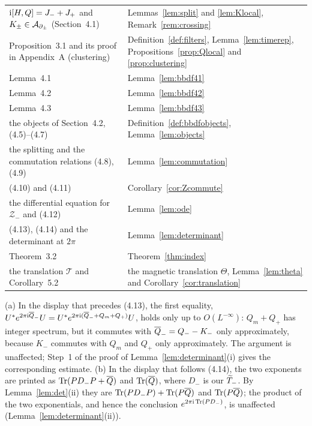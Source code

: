 \begin{longtable}{@{}p{}p{}@{}}
$\mathrm{i}[H,Q]=J_-+J_+$ and $K_\pm\in\mathcal{A}_{\partial_\pm}$ (Section~4.1) & Lemmas~\ref{lem:split} and \ref{lem:Klocal},
Remark~\ref{rem:crossing}\\
Proposition~3.1 and its proof in Appendix~A (clustering) & Definition~\ref{def:filters}, Lemma~\ref{lem:timerep},
Propositions~\ref{prop:Qlocal} and \ref{prop:clustering}\\
Lemma~4.1 & Lemma~\ref{lem:bbdf41}\\
Lemma~4.2 & Lemma~\ref{lem:bbdf42}\\
Lemma~4.3 & Lemma~\ref{lem:bbdf43}\\
the objects of Section~4.2, (4.5)--(4.7) & Definition~\ref{def:bbdfobjects}, Lemma~\ref{lem:objects}\\
the splitting and the commutation relations (4.8), (4.9) & Lemma~\ref{lem:commutation}\\
(4.10) and (4.11) & Corollary~\ref{cor:Zcommute}\\
the differential equation for $\mathcal Z_-$ and (4.12) & Lemma~\ref{lem:ode}\\
(4.13), (4.14) and the determinant at $2\pi$ & Lemma~\ref{lem:determinant}\\
Theorem~3.2 & Theorem~\ref{thm:index}\\
the translation $\mathcal T$ and Corollary~5.2 & the magnetic translation $\Theta$, Lemma~\ref{lem:theta} and
Corollary~\ref{cor:translation}\\
\end{longtable}
\endgroup

\begin{remark}\label{rem:bbdf-misprints}
(a) In the display that precedes (4.13), the first equality,
$U^*e^{2\pi\mathrm{i}\overline{Q}_-}U=U^*e^{2\pi\mathrm{i}(\overline{Q}_-+Q_m+Q_+)}U$, holds only up to $O(L^{-\infty})$: $Q_m+Q_+$ has integer spectrum, but
it commutes with $\overline{Q}_-=Q_--K_-$ only approximately, because $K_-$ commutes with $Q_m$ and $Q_+$ only approximately. The
argument is unaffected; Step~1 of the proof of Lemma~\ref{lem:determinant}(i) gives the corresponding estimate. (b) In
the display that follows (4.14), the two exponents are printed as $\operatorname{Tr}(PD_-P+\overline{Q})$ and $\operatorname{Tr}(\overline{Q})$, where $D_-$ is our $\widetilde{T}_{-}$.
By Lemma~\ref{lem:det}(ii) they are $\operatorname{Tr}(PD_-P)+\operatorname{Tr}(P\overline{Q})$ and $\operatorname{Tr}(P\overline{Q})$; the product of the two exponentials, and hence
the conclusion $e^{2\pi\mathrm{i}\operatorname{Tr}(PD_-)}$, is unaffected (Lemma~\ref{lem:determinant}(ii)).
\end{remark}
